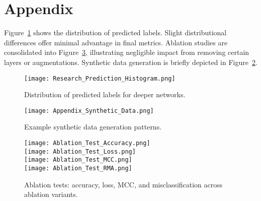 \documentclass{iclr2025_conference}
\begin{document}
\section{Appendix}
Figure~\ref{fig:prediction_hist} shows the distribution of predicted labels. Slight distributional differences offer minimal advantage in final metrics. Ablation studies are consolidated into Figure~\ref{fig:ablation_multi}, illustrating negligible impact from removing certain layers or augmentations. Synthetic data generation is briefly depicted in Figure~\ref{fig:synthetic_data}.

\begin{figure}[h]
\centering
\texttt{[image: Research\_Prediction\_Histogram.png]}
\caption{Distribution of predicted labels for deeper networks.}
\label{fig:prediction_hist}
\end{figure}

\begin{figure}[h]
\centering
\texttt{[image: Appendix\_Synthetic\_Data.png]}
\caption{Example synthetic data generation patterns.}
\label{fig:synthetic_data}
\end{figure}

\begin{figure}[h]
\centering
\texttt{[image: Ablation\_Test\_Accuracy.png]}\\
\vspace{1em}
\texttt{[image: Ablation\_Test\_Loss.png]}\\
\vspace{1em}
\texttt{[image: Ablation\_Test\_MCC.png]}\\
\vspace{1em}
\texttt{[image: Ablation\_Test\_RMA.png]}
\caption{Ablation tests: accuracy, loss, MCC, and misclassification across ablation variants.}
\label{fig:ablation_multi}
\end{figure}
\end{document}
